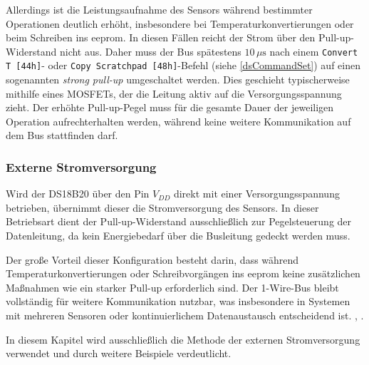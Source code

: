 	Allerdings ist die Leistungsaufnahme des Sensors während bestimmter Operationen deutlich erhöht, insbesondere bei Temperaturkonvertierungen oder beim Schreiben ins \ac{eeprom}. In diesen Fällen reicht der Strom über den Pull-up-Widerstand nicht aus. Daher muss der Bus spätestens $10\,\mu\text{s}$ nach einem \texttt{Convert T [44h]}- oder \texttt{Copy Scratchpad [48h]}-Befehl (siehe \autoref{dsCommandSet}) auf einen sogenannten \textit{strong pull-up} umgeschaltet werden. Dies geschieht typischerweise mithilfe eines MOSFETs, der die Leitung aktiv auf die Versorgungsspannung zieht. Der erhöhte Pull-up-Pegel muss für die gesamte Dauer der jeweiligen Operation aufrechterhalten werden, während keine weitere Kommunikation auf dem Bus stattfinden darf.

\subsubsection{Externe Stromversorgung \label{lab:extPowered}}
	Wird der DS18B20 über den Pin $V_{DD}$ direkt mit einer Versorgungsspannung betrieben, übernimmt dieser die Stromversorgung des Sensors. In dieser Betriebsart dient der Pull-up-Widerstand ausschlie{\ss}lich zur Pegelsteuerung der Datenleitung, da kein Energiebedarf über die Busleitung gedeckt werden muss.
	
	Der gro{\ss}e Vorteil dieser Konfiguration besteht darin, dass während Temperaturkonvertierungen oder Schreibvorgängen ins \ac{eeprom} keine zusätzlichen Ma{\ss}nahmen wie ein starker Pull-up erforderlich sind. Der 1-Wire-Bus bleibt vollständig für weitere Kommunikation nutzbar, was insbesondere in Systemen mit mehreren Sensoren oder kontinuierlichem Datenaustausch entscheidend ist. \cite{Maxim:2019}, \cite{Texas:2025}.
	
	In diesem Kapitel wird ausschlie{\ss}lich die Methode der externen Stromversorgung verwendet und durch weitere Beispiele verdeutlicht.

